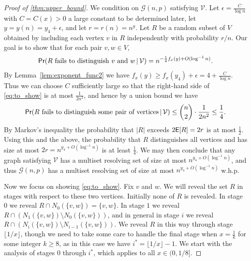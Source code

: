 \documentclass[12pt]{article}
\theoremstyle{definition}
\theoremstyle{remark}
\theoremstyle{remark}
\numberwithin{theorem}{section}
\newcommand{\E}{\textsf{\upshape E}}
\newcommand{\prob}{\textsf{\upshape Pr}}
\newcommand{\Gnp}{\mathcal{G}(n,p)}
\begin{document}
\begin{proof}[Proof of \cref{thm:upper_bound}]
We condition on $\Gnp$ satisfying $\mathcal{V}$. Let $\epsilon = \frac{C}{\log n}$ with $C = C(x) >0$ a large constant to be determined later, let $y = y(n) = y_{4} + \epsilon$, and let $r = r(n) = n^{y} $. Let $R$ be a random subset of $V$ obtained by including each vertex $v$ in $R$ independently with probability $r/n$. Our goal is to show that for each pair $v,w \in V$, 
\begin{equation}\label{eq:to_show}
	\prob(R \text{ fails to distinguish }v\text{ and }w\,|\,\mathcal{V}) = n^{-\frac{1}{2}f_{x}(y) + O(\log^{-1}n)}.
\end{equation}
By Lemma~\ref{lem:exponent_func2} we have $f_{x}(y) \geq f_{x}(y_{4}) + \epsilon = 4 + \frac{C}{\log n}$. Thus we can choose $C$ sufficiently large so that the right-hand side of \eqref{eq:to_show} is at most $\frac{1}{2n^{2}}$, and hence by a union bound we have
$$
	\prob(R\text{ fails to distinguish some pair of vertices}\,|\,\mathcal{V}) \leq \binom{n}{2} \cdot \frac{1}{2n^{2}} \le \frac{1}{4}.
$$
By Markov's inequality the probability that $|R|$ exceeds $2\E[R] = 2r$ is at most $\frac{1}{2}$. Using this and the above, the probability that $R$ distinguishes all vertices and has size at most $2r = n^{y_{4} + O(\log^{-1}n)}$ is at least $\frac{1}{4}$. We may then conclude that any graph satisfying $\mathcal{V}$ has a multiset resolving set of size at most $n^{y_{4} +O(\log^{-1}n)}$, and thus $\Gnp$ has a multiset resolving set of size at most $n^{y_{4} + O(\log^{-1}n)}$ w.h.p.

Now we focus on showing \eqref{eq:to_show}. Fix $v$ and $w$. We will reveal the set $R$ in stages with respect to these two vertices. Initially none of $R$ is revealed. In stage $0$ we reveal $R \cap N_{0}(\{v,w\}) = \{v,w\}$. In stage $1$ we reveal $R \cap (N_{1}(\{v,w\}) \setminus N_{0}(\{v,w\}))$, and in general in stage $i$ we reveal $R \cap (N_{i}(\{v,w\}) \setminus N_{i-1}(\{v,w\}))$. We reveal $R$ in this way through stage $\lfloor 1/x \rfloor$, though we need to take some care to handle the final stage when $x = \frac{1}{k}$ for some integer $k \ge 8$, as in this case we have $i^{*} = \lfloor1/x\rfloor -1$. We start with the analysis of stages $0$ through $i^{*}$, which applies to all $x \in (0,1/8]$. 


\end{proof}
\end{document}
